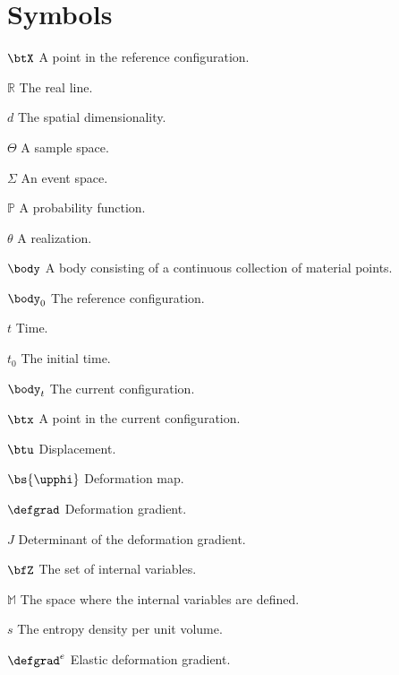 \abbreviations


\section*{Symbols}


\begin{symbollist}
  \item[$\btX$] A point in the reference configuration.
  \item[$\mathbb{R}$] The real line.
  \item[$d$] The spatial dimensionality.
  \item[$\Theta$] A sample space.
  \item[$\Sigma$] An event space.
  \item[$\mathbb{P}$] A probability function.
  \item[$\theta$] A realization.
  \item[$\body$] A body consisting of a continuous collection of material points.
  \item[$\body_0$] The reference configuration.
  \item[$t$] Time.
  \item[$t_0$] The initial time.
  \item[$\body_t$] The current configuration.
  \item[$\btx$] A point in the current configuration.
  \item[$\btu$] Displacement.
  \item[$\bs{\upphi}$] Deformation map.
  \item[$\defgrad$] Deformation gradient.
  \item[$J$] Determinant of the deformation gradient.
  \item[$\bfZ$] The set of internal variables.
  \item[$\mathbb{M}$] The space where the internal variables are defined.
  \item[$s$] The entropy density per unit volume.
  \item[$\defgrad^e$] Elastic deformation gradient.

\end{symbollist}
